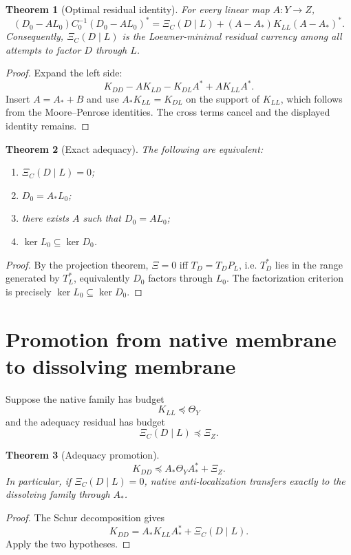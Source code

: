 \documentclass[11pt]{article}
\newtheorem{theorem}{Theorem}[section]
\begin{document}
\begin{theorem}[Optimal residual identity]
For every linear map $A:Y\to Z$,
\[
\boxed{(D_0-AL_0)C_0^{-1}(D_0-AL_0)^*
=\Xi_C(D\mid L)+(A-A_*)K_{LL}(A-A_*)^*.}
\]
Consequently, $\Xi_C(D\mid L)$ is the Loewner-minimal residual currency among all attempts to factor $D$ through $L$.
\end{theorem}

\begin{proof}
Expand the left side:
\[
K_{DD}-AK_{LD}-K_{DL}A^*+AK_{LL}A^*.
\]
Insert $A=A_*+B$ and use $A_*K_{LL}=K_{DL}$ on the support of $K_{LL}$, which follows from the Moore--Penrose identities.  The cross terms cancel and the displayed identity remains.
\end{proof}

\begin{theorem}[Exact adequacy]
The following are equivalent:
\begin{enumerate}[label=(\roman*)]
\item $\Xi_C(D\mid L)=0$;
\item $D_0=A_*L_0$;
\item there exists $A$ such that $D_0=AL_0$;
\item $\ker L_0\subseteq \ker D_0$.
\end{enumerate}
\end{theorem}

\begin{proof}
By the projection theorem, $\Xi=0$ iff $T_D=T_DP_L$, i.e. $T_D^*$ lies in the range generated by $T_L^*$, equivalently $D_0$ factors through $L_0$.  The factorization criterion is precisely $\ker L_0\subseteq\ker D_0$.
\end{proof}

\section{Promotion from native membrane to dissolving membrane}

Suppose the native family has budget
\[
K_{LL}\preceq \Theta_Y
\]
and the adequacy residual has budget
\[
\Xi_C(D\mid L)\preceq \Xi_Z.
\]

\begin{theorem}[Adequacy promotion]
\[
\boxed{K_{DD}\preceq A_*\Theta_YA_*^*+\Xi_Z.}
\]
In particular, if $\Xi_C(D\mid L)=0$, native anti-localization transfers exactly to the dissolving family through $A_*$.
\end{theorem}

\begin{proof}
The Schur decomposition gives
\[
K_{DD}=A_*K_{LL}A_*^*+\Xi_C(D\mid L).
\]
Apply the two hypotheses.
\end{proof}
\end{document}
